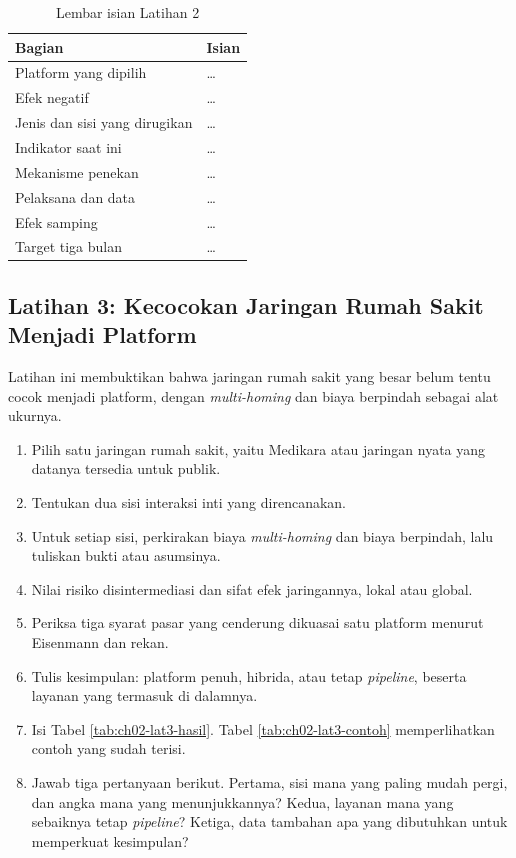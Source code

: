 \begin{table}[!htb]
  \centering
  \caption{Lembar isian Latihan 2}
  \label{tab:ch02-lat2-hasil}
  \begin{tabularx}{\textwidth}{lX}
    \hline
    \textbf{Bagian} & \textbf{Isian} \\
    \hline
    Platform yang dipilih & \dots \\
    \hline
    Efek negatif & \dots \\
    \hline
    Jenis dan sisi yang dirugikan & \dots \\
    \hline
    Indikator saat ini & \dots \\
    \hline
    Mekanisme penekan & \dots \\
    \hline
    Pelaksana dan data & \dots \\
    \hline
    Efek samping & \dots \\
    \hline
    Target tiga bulan & \dots \\
    \hline
  \end{tabularx}
\end{table}

\subsection*{Latihan 3: Kecocokan Jaringan Rumah Sakit Menjadi Platform}

Latihan ini membuktikan bahwa jaringan rumah sakit yang besar belum tentu cocok
menjadi platform, dengan \textit{multi-homing} dan biaya berpindah sebagai alat
ukurnya.

\begin{enumerate}
  \item Pilih satu jaringan rumah sakit, yaitu Medikara atau jaringan nyata
        yang datanya tersedia untuk publik.
  \item Tentukan dua sisi interaksi inti yang direncanakan.
  \item Untuk setiap sisi, perkirakan biaya \textit{multi-homing} dan biaya
        berpindah, lalu tuliskan bukti atau asumsinya.
  \item Nilai risiko disintermediasi dan sifat efek jaringannya, lokal atau
        global.
  \item Periksa tiga syarat pasar yang cenderung dikuasai satu platform
        menurut Eisenmann dan rekan.
  \item Tulis kesimpulan: platform penuh, hibrida, atau tetap
        \textit{pipeline}, beserta layanan yang termasuk di dalamnya.
  \item Isi Tabel \ref{tab:ch02-lat3-hasil}. Tabel \ref{tab:ch02-lat3-contoh}
        memperlihatkan contoh yang sudah terisi.
  \item Jawab tiga pertanyaan berikut. Pertama, sisi mana yang paling mudah
        pergi, dan angka mana yang menunjukkannya? Kedua, layanan mana yang
        sebaiknya tetap \textit{pipeline}? Ketiga, data tambahan apa yang
        dibutuhkan untuk memperkuat kesimpulan?
\end{enumerate}

